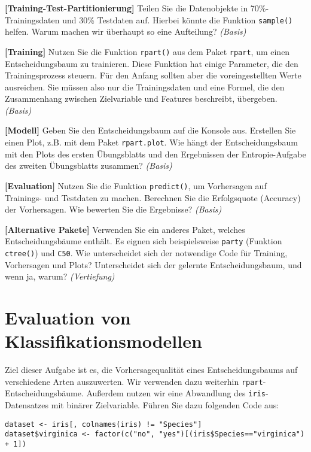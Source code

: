 \documentclass[headinclude,headsepline]{scrartcl}
\newcommand{\taskcategory}[1]{{\color[HTML]{800000}\emph{(#1)}}}
\newcommand{\taskname}[1]{\textbf{[#1]}}
\newcommand{\code}[1]{{\color[HTML]{000080}\texttt{#1}}}
\begin{document}
\begin{compactenum}[a)]\itemsep10pt
	\item
	\taskname{Training-Test-Partitionierung}
	Teilen Sie die Datenobjekte in 70\%-Trainingsdaten und 30\% Testdaten auf.
	Hierbei könnte die Funktion \code{sample()} helfen.
	Warum machen wir überhaupt so eine Aufteilung?
	\taskcategory{Basis}
	\item
	\taskname{Training}
	Nutzen Sie die Funktion \code{rpart()} aus dem Paket \code{rpart}, um einen Entscheidungsbaum zu trainieren.
	Diese Funktion hat einige Parameter, die den Trainingsprozess steuern.
	Für den Anfang sollten aber die voreingestellten Werte ausreichen.
	Sie müssen also nur die Trainingsdaten und eine Formel, die den Zusammenhang zwischen Zielvariable und Features beschreibt, übergeben.
	\taskcategory{Basis}
	\item
	\taskname{Modell}
	Geben Sie den Entscheidungsbaum auf die Konsole aus.
	Erstellen Sie einen Plot, z.B. mit dem Paket \code{rpart.plot}.
	Wie hängt der Entscheidungsbaum mit den Plots des ersten Übungsblatts und den Ergebnissen der Entropie-Aufgabe des zweiten Übungsblatts zusammen?
	\taskcategory{Basis}
	\item
	\taskname{Evaluation}
	Nutzen Sie die Funktion \code{predict()}, um Vorhersagen auf Trainings- und Testdaten zu machen.
	Berechnen Sie die Erfolgsquote (Accuracy) der Vorhersagen.
	Wie bewerten Sie die Ergebnisse?
	\taskcategory{Basis}
	\item
	\taskname{Alternative Pakete}
	Verwenden Sie ein anderes Paket, welches Entscheidungsbäume enthält.
	Es eignen sich beispielsweise \code{party} (Funktion \code{ctree()}) und \code{C50}.
	Wie unterscheidet sich der notwendige Code für Training, Vorhersagen und Plots?
	Unterscheidet sich der gelernte Entscheidungsbaum, und wenn ja, warum?
	\taskcategory{Vertiefung}
\end{compactenum}

\section{Evaluation von Klassifikationsmodellen}

Ziel dieser Aufgabe ist es, die Vorhersagequalität eines Entscheidungsbaums auf verschiedene Arten auszuwerten.
Wir verwenden dazu weiterhin \code{rpart}-Entscheidungsbäume.
Außerdem nutzen wir eine Abwandlung des \code{iris}-Datensatzes mit binärer Zielvariable.
Führen Sie dazu folgenden Code aus:

\begin{lstlisting}
dataset <- iris[, colnames(iris) != "Species"]
dataset$virginica <- factor(c("no", "yes")[(iris$Species=="virginica") + 1])
\end{lstlisting}
\end{document}
